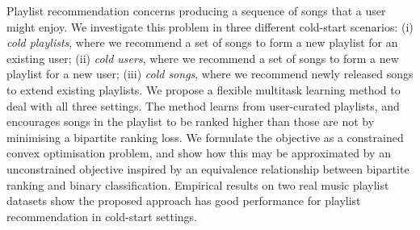 
Playlist recommendation concerns producing a sequence of songs that a user might enjoy.
We investigate this problem in three different cold-start scenarios:
(i) \emph{cold playlists}, where we recommend a set of songs to form a new playlist for an existing user; %
(ii) \emph{cold users}, where we recommend a set of songs to form a new playlist for a new user; %
(iii) \emph{cold songs}, where we recommend newly released songs to extend existing playlists.
%
We propose a flexible multitask learning method to deal with all three settings.
The method learns from user-curated playlists,
and encourages songs in the playlist 
to be ranked higher than those are not
by minimising a %
bipartite ranking loss.
We formulate the objective as a constrained convex optimisation problem,
and show how this may be approximated by an unconstrained objective
inspired by an equivalence relationship between bipartite ranking and binary classification.
Empirical results on two real music playlist datasets show the proposed approach has good performance for playlist recommendation
in cold-start settings.
